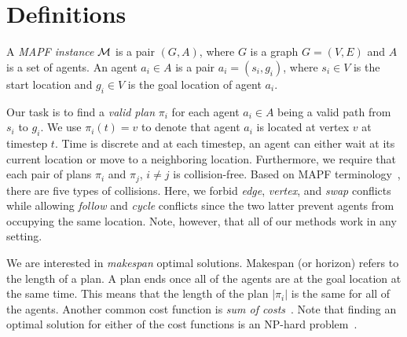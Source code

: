\section{Definitions}

A \emph{MAPF instance} $\mathcal{M}$ is a pair $(G,A)$, where $G$ is a graph $G = (V,E)$ and $A$ is a set of agents. An agent $a_i \in A$ is a pair $a_i = (s_i,g_i)$, where $s_i \in V$ is the start location and $g_i \in V$ is the goal location of agent $a_i$.

Our task is to find a \emph{valid plan} $\pi_i$ for each agent $a_i \in A$ being a valid path from $s_i$ to $g_i$. We use $\pi_i(t) = v$ to denote that agent $a_i$ is located at vertex $v$ at timestep $t$. Time is discrete and at each timestep, an agent can either wait at its current location or move to a neighboring location.
%
Furthermore, we require that each pair of plans $\pi_i$ and $\pi_j$, $i \neq j$ is collision-free. Based on MAPF terminology~\cite{stern2019mapfVarians}, there are five types of collisions. %
Here, we forbid \emph{edge}, \emph{vertex}, and \emph{swap} conflicts while allowing \emph{follow} and \emph{cycle} conflicts since the two latter prevent agents from occupying the same location. Note, however, that all of our methods work in any setting.%
%

We are interested in \emph{makespan} optimal solutions. Makespan (or horizon) refers to the length of a plan. %
A plan ends once all of the agents are at the goal location at the same time. This means that the length of the plan $|\pi_i|$ is the same for all of the agents. Another common cost function is \emph{sum of costs}~\cite{ICTS_soc}. Note that finding an optimal solution for either of the cost functions is an NP-hard problem~\cite{NP-hard1,NP-hard2}.

